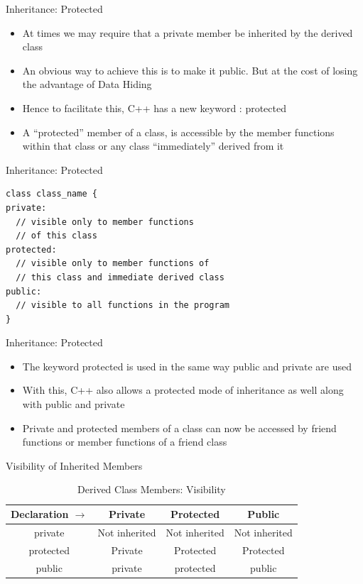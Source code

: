 \documentclass{beamer}
\begin{document}
\begin{frame}[fragile]{Inheritance: Protected}
  \begin{itemize}
    \item At times we may require that a private member be inherited by the derived class\pause
    \item An obvious way to achieve this is to make it public. But at the cost of losing the advantage of Data Hiding\pause
    \item Hence to facilitate this, C++ has a new keyword : protected\pause
    \item A ``protected'' member of a class, is accessible by the member functions within that class or any class ``immediately'' derived from it
  \end{itemize}
\end{frame}

\begin{frame}[fragile]{Inheritance: Protected}
  \begin{lstlisting}
class class_name {
private:
  // visible only to member functions 
  // of this class
protected:
  // visible only to member functions of 
  // this class and immediate derived class
public:
  // visible to all functions in the program
}
  \end{lstlisting}
\end{frame}

\begin{frame}[fragile]{Inheritance: Protected}
  \begin{itemize}
    \item The keyword protected is used in the same way public and private are used\pause
    \item With this, C++ also allows a protected mode of inheritance as well along with public and private\pause
    \item Private and protected members of a class can now be accessed by friend functions or member functions of a friend class
  \end{itemize}
\end{frame}

\begin{frame}[fragile]{Visibility of Inherited Members}
  \begin{table}
    \caption{Derived Class Members: Visibility}
    \begin{tabular}{|c|c|c|c|}\hline
      Declaration $\rightarrow$ & Private & Protected & Public\\\hline
      private & Not inherited & Not inherited & Not inherited\\\hline
      protected & Private & Protected & Protected\\\hline
      public & private & protected & public\\\hline
    \end{tabular}
  \end{table}
\end{frame}
\end{document}
